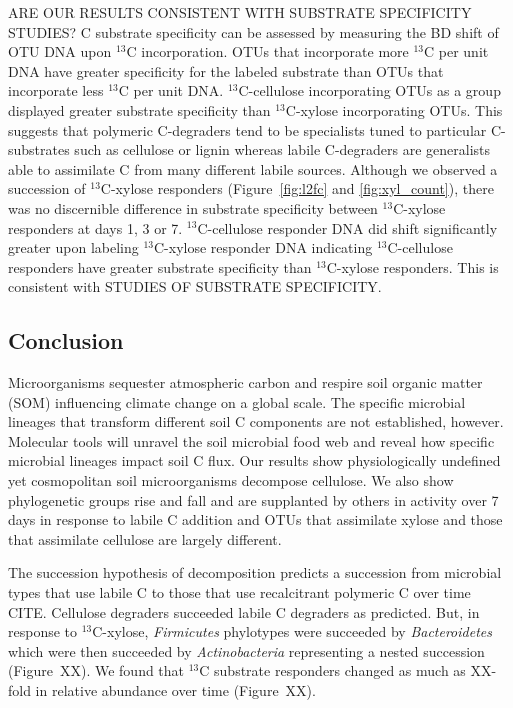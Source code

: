 ARE OUR RESULTS CONSISTENT WITH SUBSTRATE SPECIFICITY STUDIES? C substrate
specificity can be assessed by measuring the BD shift of OTU DNA upon $^{13}$C
incorporation. OTUs that incorporate more $^{13}$C per unit DNA have greater
specificity for the labeled substrate than OTUs that incorporate less $^{13}$C
per unit DNA. $^{13}$C-cellulose incorporating OTUs as a group displayed
greater substrate specificity than $^{13}$C-xylose incorporating OTUs. This
suggests that polymeric C-degraders tend to be specialists tuned to particular
C-substrates such as cellulose or lignin whereas labile C-degraders are
generalists able to assimilate C from many different labile sources. Although
we observed a succession of $^{13}$C-xylose responders (Figure~\ref{fig:l2fc}
and \ref{fig:xyl_count}), there was no discernible difference in substrate
specificity between $^{13}$C-xylose responders at days 1, 3 or 7.
$^{13}$C-cellulose responder DNA did shift significantly greater upon labeling
$^{13}$C-xylose responder DNA indicating $^{13}$C-cellulose responders have
greater substrate specificity than $^{13}$C-xylose responders. This is
consistent with STUDIES OF SUBSTRATE SPECIFICITY.


\subsection{Conclusion} 
Microorganisms sequester atmospheric carbon and respire soil organic matter
(SOM) influencing climate change on a global scale. The specific microbial
lineages that transform different soil C components are not established,
however. Molecular tools will unravel the soil microbial food web and reveal
how specific microbial lineages impact soil C flux. Our results show
physiologically undefined yet cosmopolitan soil microorganisms decompose
cellulose. We also show phylogenetic groups rise and fall and are supplanted by
others in activity over 7 days in response to labile C addition and OTUs that
assimilate xylose and those that assimilate cellulose are largely different. 

The succession hypothesis of decomposition predicts a succession from
microbial types that use labile C to those that use recalcitrant polymeric
C over time CITE. Cellulose degraders succeeded labile C degraders as
predicted. But, in response to $^{13}$C-xylose, \textit{Firmicutes}
phylotypes were succeeded by \textit{Bacteroidetes} which were then
succeeded by \textit{Actinobacteria} representing a nested succession
(Figure~XX). We found that $^{13}$C substrate responders changed as much as
XX-fold in relative abundance over time (Figure~XX). 

